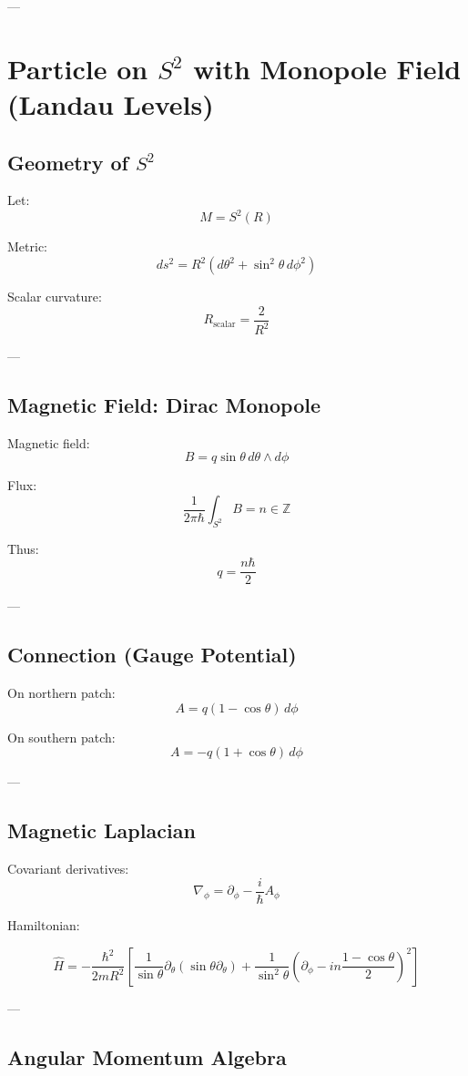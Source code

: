 ---

\section{Particle on $S^2$ with Monopole Field (Landau Levels)}

\subsection{Geometry of $S^2$}

Let:
\[
M = S^2(R)
\]

Metric:
\[
ds^2 = R^2(d\theta^2 + \sin^2\theta\, d\phi^2)
\]

Scalar curvature:
\[
R_{\text{scalar}} = \frac{2}{R^2}
\]

---

\subsection{Magnetic Field: Dirac Monopole}

Magnetic field:
\[
B = q \sin\theta\, d\theta \wedge d\phi
\]

Flux:
\[
\frac{1}{2\pi\hbar} \int_{S^2} B = n \in \mathbb{Z}
\]

Thus:
\[
q = \frac{n\hbar}{2}
\]

---

\subsection{Connection (Gauge Potential)}

On northern patch:
\[
A = q(1-\cos\theta)\, d\phi
\]

On southern patch:
\[
A = -q(1+\cos\theta)\, d\phi
\]

---

\subsection{Magnetic Laplacian}

Covariant derivatives:
\[
\nabla_\phi = \partial_\phi - \frac{i}{\hbar}A_\phi
\]

Hamiltonian:

\[
\hat{H}
=
-\frac{\hbar^2}{2mR^2}
\left[
\frac{1}{\sin\theta}\partial_\theta(\sin\theta \partial_\theta)
+
\frac{1}{\sin^2\theta}
\left(\partial_\phi - i n \frac{1-\cos\theta}{2}\right)^2
\right]
\]

---

\subsection{Angular Momentum Algebra}

